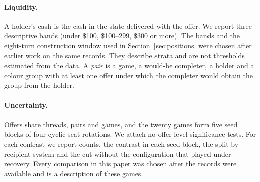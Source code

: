 \documentclass[11pt,letterpaper]{article}
\begin{document}
\paragraph{Liquidity.} A holder's cash is the cash in the state delivered with the offer. We report three descriptive bands (under \$100, \$100--299, \$300 or more). The bands and the eight-turn construction window used in Section~\ref{sec:positions} were chosen after earlier work on the same records. They describe strata and are not thresholds estimated from the data. A \emph{pair} is a game, a would-be completer, a holder and a colour group with at least one offer under which the completer would obtain the group from the holder.

\paragraph{Uncertainty.} Offers share threads, pairs and games, and the twenty games form five seed blocks of four cyclic seat rotations. We attach no offer-level significance tests. For each contrast we report counts, the contrast in each seed block, the split by recipient system and the cut without the configuration that played under recovery. Every comparison in this paper was chosen after the records were available and is a description of these games.
\end{document}
